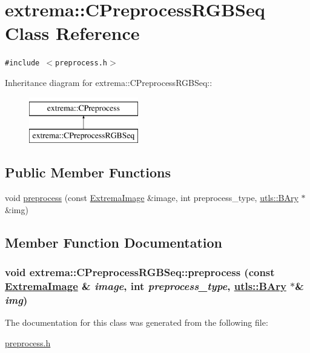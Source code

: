 \hypertarget{classextrema_1_1CPreprocessRGBSeq}{
\section{extrema::CPreprocess\-RGBSeq Class Reference}
\label{classextrema_1_1CPreprocessRGBSeq}
}
{\tt \#include $<$preprocess.h$>$}

Inheritance diagram for extrema::CPreprocess\-RGBSeq::\begin{figure}[H]
\begin{center}
\leavevmode
\includegraphics[height=2cm]{classextrema_1_1CPreprocessRGBSeq}
\end{center}
\end{figure}
\subsection*{Public Member Functions}
\begin{CompactItemize}
\item 
void \hyperlink{classextrema_1_1CPreprocessRGBSeq_f4498b310266b9bf2d31a3bd7e6facad}{preprocess} (const \hyperlink{structextrema_1_1ExtremaImage}{Extrema\-Image} \&image, int preprocess\_\-type, \hyperlink{structutls_1_1Ary}{utls::BAry} $\ast$\&img)
\end{CompactItemize}


\subsection{Member Function Documentation}
\hypertarget{classextrema_1_1CPreprocessRGBSeq_f4498b310266b9bf2d31a3bd7e6facad}{
\subsubsection[preprocess]{\setlength{\rightskip}{0pt plus 5cm}void extrema::CPreprocess\-RGBSeq::preprocess (const \hyperlink{structextrema_1_1ExtremaImage}{Extrema\-Image} \& {\em image}, int {\em preprocess\_\-type}, \hyperlink{structutls_1_1Ary}{utls::BAry} $\ast$\& {\em img})}}
\label{classextrema_1_1CPreprocessRGBSeq_f4498b310266b9bf2d31a3bd7e6facad}




The documentation for this class was generated from the following file:\begin{CompactItemize}
\item 
\hyperlink{preprocess_8h}{preprocess.h}\end{CompactItemize}
